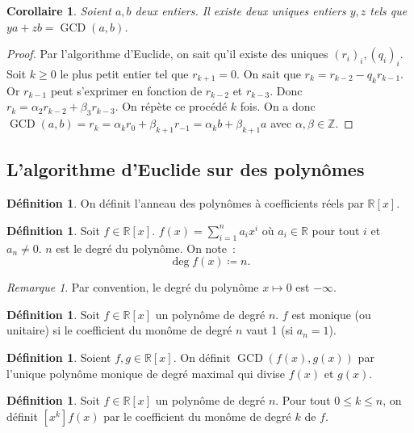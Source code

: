 \documentclass{article}
\DeclareMathOperator{\GCD}{GCD}
\newcommand{\Z}{\mathbb Z}
\newcommand{\R}{\mathbb R}
\newtheorem{cor}[thm]{Corollaire}
\theoremstyle{definition}
\newtheorem{déf}[thm]{Définition}
\theoremstyle{remark}
\newtheorem*{rmq}{Remarque}
\begin{document}
		\begin{cor} Soient $a, b$ deux entiers. Il existe deux uniques entiers $y, z$ tels que $ya + zb = \GCD(a, b)$. \end{cor}

		\begin{proof} Par l'algorithme d'Euclide, on sait qu'il existe des uniques $(r_i)_i, (q_i)_i$. Soit $k \geq 0$ le plus petit entier tel que $r_{k+1} = 0$. On sait
		que $r_k = r_{k-2} - q_kr_{k-1}$. Or $r_{k-1}$ peut s'exprimer en fonction de $r_{k-2}$ et $r_{k-3}$. Donc $r_k = \alpha_2r_{k-2}+\beta_3r_{k-3}$.
		On répète ce procédé $k$ fois. On a donc $\GCD(a, b) = r_k = \alpha_kr_0 + \beta_{k+1}r_{-1} = \alpha_kb + \beta_{k+1}a$ avec $\alpha, \beta \in \Z$. \end{proof}

	\subsection{L'algorithme d'Euclide sur des polynômes}
		\begin{déf} On définit l'anneau des polynômes à coefficients réels par $\R[x]$. \end{déf}

		\begin{déf} Soit $f \in \R[x]$. $\displaystyle f(x) = \sum_{i=1}^na_ix^i$ où $a_i \in \R$ pour tout $i$ et $a_n \neq 0$. $n$ est le degré du polynôme.
		On note~: \[\deg f(x) \coloneqq n.\] \end{déf}

		\begin{rmq} Par convention, le degré du polynôme $x \mapsto 0$ est $-\infty$. \end{rmq}

		\begin{déf} Soit $f \in \R[x]$ un polynôme de degré $n$. $f$ est monique (ou unitaire) si le coefficient du monôme de degré $n$ vaut 1 (si $a_n = 1$). \end{déf}

		\begin{déf} Soient $f, g \in \R[x]$. On définit $\GCD(f(x), g(x))$ par l'unique polynôme monique de degré maximal qui divise $f(x)$ et $g(x)$. \end{déf}

		\begin{déf} Soit $f \in \R[x]$ un polynôme de degré $n$. Pour tout $0 \leq k \leq n$, on définit $[x^k]f(x)$ par le coefficient du monôme de degré $k$ de $f$.
		\end{déf}
\end{document}
